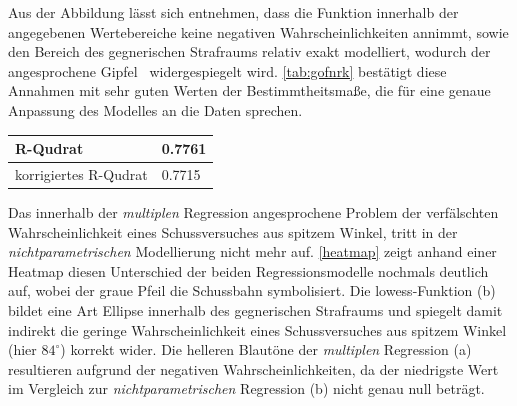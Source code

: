 Aus der Abbildung lässt sich entnehmen, dass die Funktion innerhalb der angegebenen Wertebereiche keine negativen Wahrscheinlichkeiten annimmt, sowie den Bereich des gegnerischen Strafraums relativ exakt modelliert, wodurch der angesprochene \glqq Gipfel\grqq~ widergespiegelt wird. \vref{tab:gofnrk} bestätigt diese Annahmen mit sehr guten Werten der Bestimmtheitsmaße, die für eine genaue Anpassung des Modelles an die Daten sprechen.

\tablehead{}
\tabletail{}
\tablelasttail{}
\begin{center}%
\begin{supertabular}{ | P{6cm} | P{3cm}  |}
\textsf{R-Qudrat} 	& 0.7761	\\
\hline
\textsf{korrigiertes R-Qudrat} 	&  0.7715	\\
\hline
\end{supertabular}
\end{center}

Das innerhalb der \textit{multiplen} Regression angesprochene Problem der verfälschten Wahrscheinlichkeit eines Schussversuches aus spitzem Winkel, tritt in der \textit{nichtparametrischen} Modellierung nicht mehr auf. \vref{heatmap} zeigt anhand einer Heatmap diesen Unterschied der beiden Regressionsmodelle nochmals deutlich auf, wobei der graue Pfeil die Schussbahn symbolisiert. Die \gls{lowess}-Funktion (b) bildet eine Art Ellipse innerhalb des gegnerischen Strafraums und spiegelt damit indirekt die geringe Wahrscheinlichkeit eines Schussversuches aus spitzem Winkel (hier $84^\circ$) korrekt wider. Die helleren Blautöne der \textit{multiplen} Regression (a) resultieren aufgrund der negativen Wahrscheinlichkeiten, da der niedrigste Wert im Vergleich zur \textit{nichtparametrischen} Regression (b) nicht genau null beträgt.

